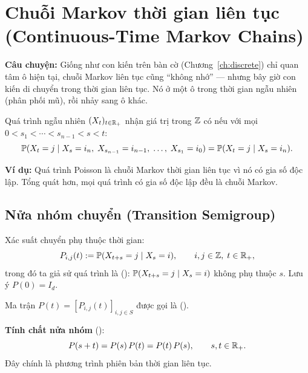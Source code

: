 \section{Chuỗi Markov thời gian liên tục (Continuous-Time Markov Chains)}
\label{sec:ctmc-definition}

\textbf{Câu chuyện:} Giống như con kiến trên bàn cờ (Chương~\ref{ch:discrete}) chỉ quan tâm ô hiện tại,
chuỗi Markov liên tục cũng ``không nhớ'' --- nhưng bây giờ con kiến di chuyển trong thời gian liên tục.
Nó ở một ô trong thời gian ngẫu nhiên (phân phối mũ), rồi nhảy sang ô khác.

\begin{dinhnghia}
Quá trình ngẫu nhiên $(X_t)_{t\in\mathbb{R}_+}$ nhận giá trị trong $\mathbb{Z}$ có  nếu với mọi
$0 < s_1 < \cdots < s_{n-1} < s < t$:
\[
  \mathbb{P}(X_t = j \mid X_s = i_n,\; X_{s_{n-1}} = i_{n-1},\; \ldots,\; X_{s_1} = i_0) = \mathbb{P}(X_t = j \mid X_s = i_n).
\]
\end{dinhnghia}

\textbf{Ví dụ:} Quá trình Poisson là chuỗi Markov thời gian liên tục vì nó có gia số độc lập.
Tổng quát hơn, mọi quá trình có gia số độc lập đều là chuỗi Markov.

\subsection{Nửa nhóm chuyển (Transition Semigroup)}

Xác suất chuyển phụ thuộc thời gian:
\[
  P_{i,j}(t) := \mathbb{P}(X_{t+s} = j \mid X_s = i), \qquad i,j \in \mathbb{Z},\; t \in \mathbb{R}_+,
\]
trong đó ta giả sử quá trình là  (): $\mathbb{P}(X_{t+s} = j \mid X_s = i)$ không phụ thuộc $s$. Lưu ý $P(0) = I_d$.

Ma trận $P(t) = [P_{i,j}(t)]_{i,j\in S}$ được gọi là  ().

\begin{congthuc}
\textbf{Tính chất nửa nhóm} ():
\begin{equation}\label{eq:semigroup}
  P(s+t) = P(s)\,P(t) = P(t)\,P(s), \qquad s, t \in \mathbb{R}_+.
\end{equation}
Đây chính là phương trình  phiên bản thời gian liên tục.
\end{congthuc}

